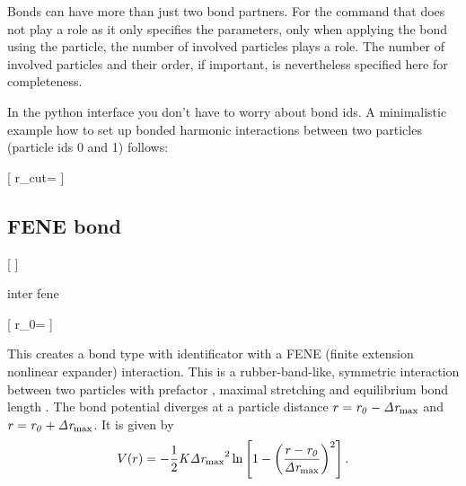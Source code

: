Bonds can have more than just two bond partners. For the  command
that does not play a role as it only specifies the parameters, only when
applying the bond using the  particle, the number of involved
particles plays a role. The number of involved particles and their order, if
important, is nevertheless specified here for completeness.

In the python interface you don't have to worry about bond ids.
A minimalistic example how to set up bonded harmonic interactions between two particles (particle ids 0 and 1) follows:

\PythonSyntaxOn
\begin{pysyntax}
  [
    r_cut=
  ]
\end{pysyntax}
\PythonSyntaxOff

\subsection{FENE bond}

\PythonSyntaxOn
\begin{pysyntax}
  [
  ]
\end{pysyntax}
\PythonSyntaxOff

\begin{essyntax}
  inter 
  fene
    
\end{essyntax}
\PythonSyntaxOn
\begin{pysyntax}
 [
    r_0=
  ]
\end{pysyntax}
\PythonSyntaxOff

This creates a bond type with identificator  with a
FENE (finite extension nonlinear expander) interaction. This is a
rubber-band-like, symmetric interaction between two particles with
prefactor , maximal stretching  and
equilibrium bond length .  The bond potential diverges at a
particle distance $r=\var{r_0}-\var{\Delta r_\mathrm{max}}$ and
$r=\var{r_0}+\var{\Delta r_\mathrm{max}}$. It is given by
\begin{equation}
  V(r) = -\frac{1}{2} \var{K} \var{\Delta r_\mathrm{max}}^2\ln \left[ 1 - \left(
      \frac{r-\var{r_0}}{\var{\Delta r_\mathrm{max}}} \right)^2 \right].
\end{equation}

